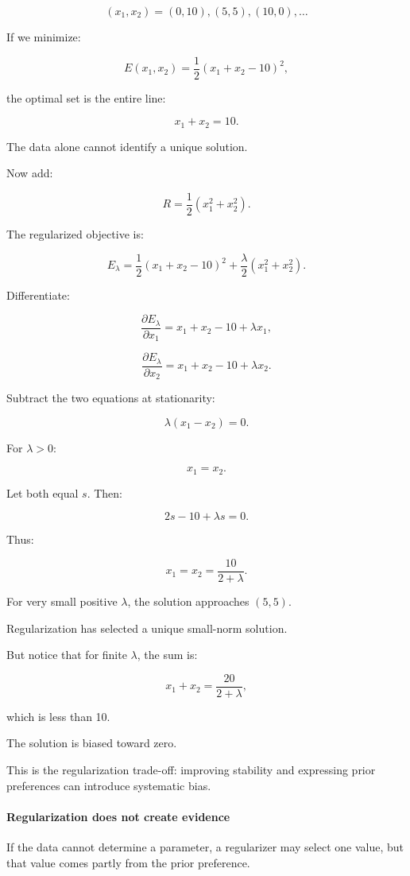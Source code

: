 \[
(x_1,x_2)=(0,10),(5,5),(10,0),\ldots
\]

If we minimize:

\[
E(x_1,x_2)=\frac12(x_1+x_2-10)^2,
\]

the optimal set is the entire line:

\[
x_1+x_2=10.
\]

The data alone cannot identify a unique solution.

Now add:

\[
R=\frac12(x_1^2+x_2^2).
\]

The regularized objective is:

\[
E_\lambda= \frac12(x_1+x_2-10)^2 +\frac\lambda2(x_1^2+x_2^2).
\]

Differentiate:

\[
\frac{\partial E_\lambda}{\partial x_1} = x_1+x_2-10+\lambda x_1,
\]

\[
\frac{\partial E_\lambda}{\partial x_2} = x_1+x_2-10+\lambda x_2.
\]

Subtract the two equations at stationarity:

\[
\lambda(x_1-x_2)=0.
\]

For \(\lambda>0\):

\[
x_1=x_2.
\]

Let both equal \(s\). Then:

\[
2s-10+\lambda s=0.
\]

Thus:

\[
\boxed{ x_1=x_2=\frac{10}{2+\lambda} }.
\]

For very small positive \(\lambda\), the solution approaches \((5,5)\).

Regularization has selected a unique small-norm solution.

But notice that for finite \(\lambda\), the sum is:

\[
x_1+x_2=\frac{20}{2+\lambda},
\]

which is less than 10.

The solution is biased toward zero.

This is the regularization trade-off: improving stability and expressing prior preferences can introduce systematic bias.

\paragraph{Regularization does not create evidence}\label{02-foundations-ii-ch027-regularization-does-not-create-evidence}

If the data cannot determine a parameter, a regularizer may select one value, but that value comes partly from the prior preference.

